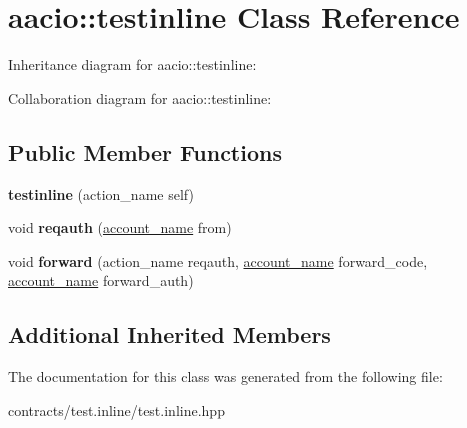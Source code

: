 \hypertarget{classaacio_1_1testinline}{}\section{aacio\+:\+:testinline Class Reference}
\label{classaacio_1_1testinline}


Inheritance diagram for aacio\+:\+:testinline\+:


Collaboration diagram for aacio\+:\+:testinline\+:
\subsection*{Public Member Functions}
\begin{DoxyCompactItemize}
\item 
\mbox{\label{classaacio_1_1testinline_a3168cc6bf58f48ec8d662f9bcfff14c6}} 
{\bfseries testinline} (action\+\_\+name self)
\item 
\mbox{\label{classaacio_1_1testinline_a453a62b932669e72dcd486ae4716112b}} 
void {\bfseries reqauth} (\mbox{\hyperlink{structaacio_1_1chain_1_1name}{account\+\_\+name}} from)
\item 
\mbox{\label{classaacio_1_1testinline_aadcaa17537c9d3e37eecf5471bbcf276}} 
void {\bfseries forward} (action\+\_\+name reqauth, \mbox{\hyperlink{structaacio_1_1chain_1_1name}{account\+\_\+name}} forward\+\_\+code, \mbox{\hyperlink{structaacio_1_1chain_1_1name}{account\+\_\+name}} forward\+\_\+auth)
\end{DoxyCompactItemize}
\subsection*{Additional Inherited Members}


The documentation for this class was generated from the following file\+:\begin{DoxyCompactItemize}
\item 
contracts/test.\+inline/test.\+inline.\+hpp\end{DoxyCompactItemize}
